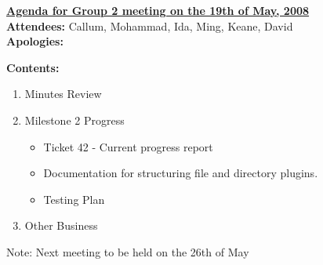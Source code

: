 \documentclass{letter}
\begin{document}
{\large \textbf{\underline{Agenda for Group 2 meeting on the 19th of May, 2008}}}\\

\textbf{Attendees:} Callum, Mohammad, Ida, Ming, Keane, David\\
\textbf{Apologies:}

\textbf{Contents:}

\begin{enumerate}
\item Minutes Review
\item Milestone 2 Progress
	\begin{itemize}
	\item Ticket 42 - Current progress report
	\item Documentation for structuring file and directory plugins.
	\item Testing Plan
	\end{itemize}
\item Other Business
\end{enumerate}
 
Note: Next meeting to be held on the 26th of May
\end{document}
